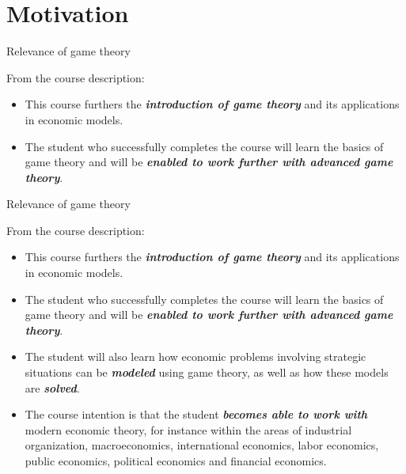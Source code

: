 \section{Motivation}

\begin{frame}{Relevance of game theory}
\begin{multicols}{2}
From the course description:
\begin{itemize}
  \item[1.] This course furthers the \textit{\textbf{introduction of game theory}} and its applications in economic models.
  \item[2.] The student who successfully completes the course will learn the basics of game theory and will be \textit{\textbf{enabled to work further with advanced game theory}}.
\end{itemize}
\columnbreak
\vfill\null
\end{multicols}
\end{frame}

\begin{frame}{Relevance of game theory}
\begin{multicols}{2}
\color{lightgray}
From the course description:
\begin{itemize}\color{lightgray}
  \item[\textcolor{lightgray}{1.}] This course furthers the \textit{\textbf{introduction of game theory}} and its applications in economic models.
  \item[\textcolor{lightgray}{2.}] The student who successfully completes the course will learn the basics of game theory and will be \textit{\textbf{enabled to work further with advanced game theory}}.
\end{itemize}
\columnbreak
\begin{itemize}
  \item[3.] The student will also learn how economic problems involving strategic situations can be \textit{\textbf{modeled}} using game theory, as well as how these models are \textit{\textbf{solved}}.
  \item[4.] The course intention is that the student \textit{\textbf{becomes able to work with}} modern economic theory, for instance within the areas of industrial organization, macroeconomics, international economics, labor economics, public economics, political economics and financial economics.
\end{itemize}
\end{multicols}
\end{frame}

